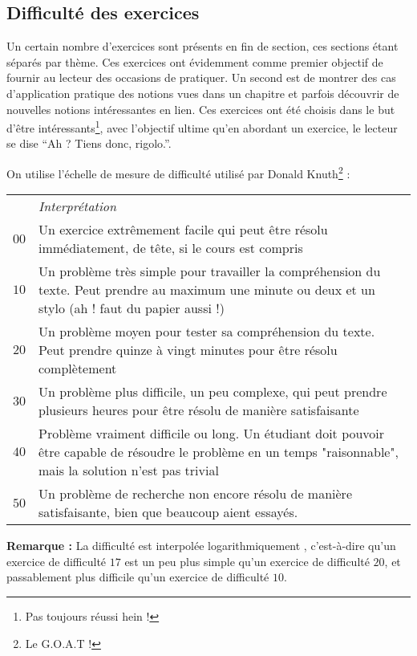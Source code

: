 \documentclass[../main.tex]{subfiles}
\begin{document}
\hrulefill

\subsection*{Difficulté des exercices}

Un certain nombre d'exercices sont présents en fin de section, ces sections étant séparés par thème. Ces exercices ont évidemment comme premier objectif de fournir au lecteur des occasions de pratiquer. Un second est de montrer des cas d'application pratique des notions vues dans un chapitre et parfois découvrir de nouvelles notions intéressantes en lien. Ces exercices ont été choisis dans le but d'être intéressants\footnote{Pas toujours réussi hein !}, avec l'objectif ultime qu'en abordant un exercice, le lecteur se dise ``Ah ? Tiens donc, rigolo.''.

On utilise l'échelle de mesure de difficulté utilisé par Donald Knuth\footnote{Le G.O.A.T !}\cite{TAOCP} : 
\begin{center}
	\begin{tabular}{cp{}}
	& \textit{Interprétation} \\
	$00$ & Un exercice extrêmement facile qui peut être résolu immédiatement, de tête, si le cours est compris \\
	$10$ & Un problème très simple pour travailler la compréhension du texte. Peut prendre au maximum une minute ou deux et un stylo (ah ! faut du papier aussi !)\\
	$20$ & Un problème moyen pour tester sa compréhension du texte. Peut prendre quinze à vingt minutes pour être résolu complètement \\
	$30$ & Un problème plus difficile, un peu complexe, qui peut prendre plusieurs heures pour être résolu de manière satisfaisante \\
	$40$ & Problème vraiment difficile ou long. Un étudiant doit pouvoir être capable de résoudre le problème en un temps "raisonnable", mais la solution n'est pas trivial \\
	$50$ & Un problème de recherche non encore résolu de manière satisfaisante, bien que beaucoup aient essayés.
	\end{tabular}
\end{center}
\textbf{Remarque : } La difficulté est interpolée \og logarithmiquement \fg, c'est-à-dire qu'un exercice de difficulté $17$ est un peu plus simple qu'un exercice de difficulté $20$, et passablement plus difficile qu'un exercice de difficulté $10$.
\end{document}
